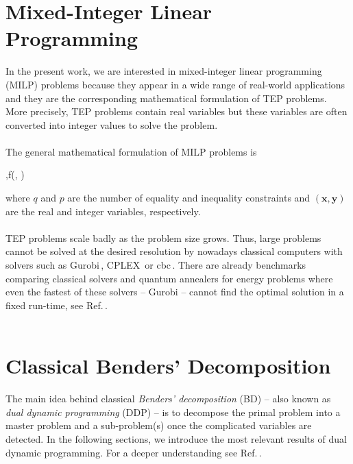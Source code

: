 \section{Mixed-Integer Linear Programming}
In the present work, we are interested in mixed-integer linear programming (MILP) problems because they appear in a wide range of real-world applications and they are the corresponding mathematical formulation of TEP problems. More precisely, TEP problems contain real variables but these variables are often converted into integer values to solve the problem.\\\\
The general mathematical formulation of MILP problems is
\begin{mini!}[2]
	{,}{f(, )}{\label{eq: MILP}}{}{}
\end{mini!}
where $q$ and $p$ are the number of equality and inequality constraints and $(\mathbf{x},\mathbf{y})$ are the real and integer variables, respectively.\\\\
TEP problems scale badly as the problem size grows. Thus, large problems cannot be solved at the desired resolution by nowadays classical computers with solvers such as Gurobi\,\cite{gurobi}, CPLEX\,\cite{cplex2009v12} or cbc\,\cite{cbc}. There are already benchmarks comparing classical solvers and quantum annealers for energy problems where even the fastest of these solvers -- Gurobi -- cannot find the optimal solution in a fixed run-time, see Ref.\,\cite{Fernandez-Campoamor2021CommunityAnnealing}. \\\\
\section{Classical Benders' Decomposition}
The main idea behind classical \textit{Benders' decomposition} (BD) -- also known as \textit{dual dynamic programming} (DDP) -- is to decompose the primal problem into a master problem and a sub-problem(s) once the complicated variables are detected. In the following sections, we introduce the most relevant results of dual dynamic programming. For a deeper understanding see Ref.\,\cite{bierlaire2018}.
